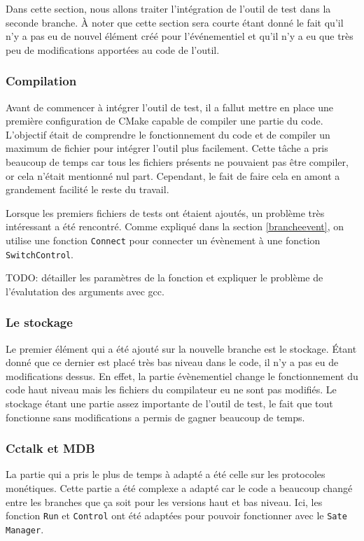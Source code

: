 \documentclass[a4paper]{article}
\begin{document}
Dans cette section, nous allons traiter l'intégration de l'outil de test dans la
seconde branche. À noter que cette section sera courte étant donné le fait qu'il
n'y a pas eu de nouvel élément créé pour l'événementiel et qu'il n'y a eu que
très peu de modifications apportées au code de l'outil.

\subsubsection*{Compilation}

Avant de commencer à intégrer l'outil de test, il a fallut mettre en place une
première configuration de CMake capable de compiler une partie du code.
L'objectif était de comprendre le fonctionnement du code et de compiler un
maximum de fichier pour intégrer l'outil plus facilement. Cette tâche a pris
beaucoup de temps car tous les fichiers présents ne pouvaient pas être compiler,
or cela n'était mentionné nul part. Cependant, le fait de faire cela en amont a
grandement facilité le reste du travail.

Lorsque les premiers fichiers de tests ont étaient ajoutés, un problème très
intéressant a été rencontré. Comme expliqué dans la section \ref{brancheevent},
on utilise une fonction \verb|Connect| pour connecter un évènement à une
fonction \verb|SwitchControl|.

TODO: détailler les paramètres de la fonction et expliquer le problème de
l'évalutation des arguments avec gcc.

\subsubsection*{Le stockage}

Le premier élément qui a été ajouté sur la nouvelle branche est le stockage.
Étant donné que ce dernier est placé très bas niveau dans le code, il n'y a pas
eu de modifications dessus. En effet, la partie évènementiel change le
fonctionnement du code haut niveau mais les fichiers du compilateur eu ne sont
pas modifiés. Le stockage étant une partie assez importante de l'outil de test,
le fait que tout fonctionne sans modifications a permis de gagner beaucoup de
temps.

\subsubsection*{Cctalk et MDB}

La partie qui a pris le plus de temps à adapté a été celle sur les protocoles
monétiques. Cette partie a été complexe a adapté car le code a beaucoup changé
entre les branches que ça soit pour les versions haut et bas niveau. Ici, les
fonction \verb|Run| et \verb|Control| ont été adaptées pour pouvoir fonctionner
avec le \verb|Sate Manager|.
\end{document}
